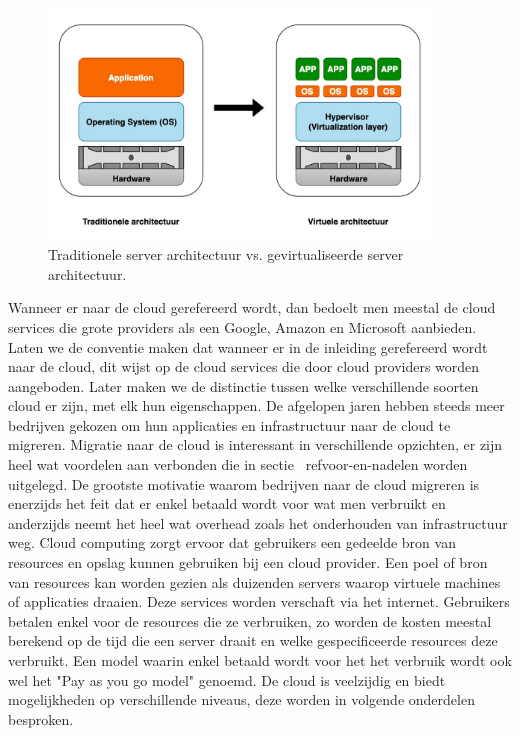 \newline
\begin{figure}
    \centering
    \includegraphics[width=0.9\textwidth]{img/klassiek_virtualisatie}
    \caption{Traditionele server architectuur vs. gevirtualiseerde server architectuur.} 
    \label{fig:klassiek-vs-virtualisatie}  
\end{figure}
\newline

Wanneer er naar de cloud gerefereerd wordt, dan bedoelt men meestal de cloud services die grote providers als een Google, Amazon en Microsoft aanbieden. Laten we de conventie maken dat wanneer er in de inleiding gerefereerd wordt naar de cloud, dit wijst op de cloud services die door cloud providers worden aangeboden. Later maken we de distinctie tussen welke verschillende soorten cloud er zijn, met elk hun eigenschappen. De afgelopen jaren hebben steeds meer bedrijven gekozen om hun applicaties en infrastructuur naar de cloud te migreren. Migratie naar de cloud is interessant in verschillende opzichten, er zijn heel wat voordelen aan verbonden die in sectie ~ref{voor-en-nadelen} worden uitgelegd. De grootste motivatie waarom bedrijven naar de cloud migreren is enerzijds het feit dat er enkel betaald wordt voor wat men verbruikt en anderzijds neemt het heel wat overhead zoals het onderhouden van infrastructuur weg. Cloud computing zorgt ervoor dat gebruikers een gedeelde bron van resources en opslag kunnen gebruiken bij een cloud provider. Een poel of bron van resources kan worden gezien als duizenden servers waarop virtuele machines of applicaties draaien. Deze services worden verschaft via het internet. Gebruikers betalen enkel voor de resources die ze verbruiken, zo worden de kosten meestal berekend op de tijd die een server draait en welke gespecificeerde resources deze verbruikt. Een model waarin enkel betaald wordt voor het het verbruik wordt ook wel het "Pay as you go model" genoemd. De cloud is veelzijdig en biedt mogelijkheden op verschillende niveaus, deze worden in volgende onderdelen besproken. \autocite{Seghal2018} 


